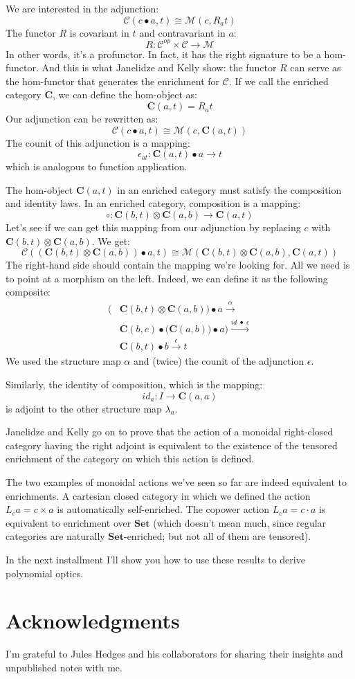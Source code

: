 \documentclass[11pt]{amsart}
\begin{document}
We are interested in the adjunction:
\[ \mathcal{C}( c \bullet a, t) \cong \mathcal{M}(c, R_a t) \]
The functor $R$ is covariant in $t$ and contravariant in $a$:
\[ R \colon \mathcal{C}^{op} \times \mathcal{C} \to \mathcal{M} \]
In other words, it's a profunctor. In fact, it has the right signature to be a hom-functor. And this is what Janelidze and Kelly show: the functor $R$ can serve as the hom-functor that generates the enrichment for $\mathcal{C}$. If we call the enriched category $\mathbf{C}$, we can define the hom-object as:
\[\mathbf{C}(a, t) = R_a t \]
Our adjunction can be rewritten as:
\[ \mathcal{C}( c \bullet a, t) \cong \mathcal{M}(c, \mathbf{C}(a, t)) \]
The counit of this adjunction is a mapping:
\[ \epsilon_{a t} \colon \mathbf{C}(a, t)  \bullet a \to t \]
which is analogous to function application.

The hom-object $\mathbf{C}(a, t)$ in an enriched category must satisfy the composition and identity laws. In an enriched category, composition is a mapping:
\[ \circ \colon \mathbf{C}(b, t) \otimes \mathbf{C}(a, b) \to \mathbf{C}(a, t) \]
Let's see if we can get this mapping from our adjunction by replacing $c$ with $\mathbf{C}(b, t) \otimes \mathbf{C}(a, b)$. We get:
\[ \mathcal{C}( (\mathbf{C}(b, t) \otimes \mathbf{C}(a, b)) \bullet a, t) \cong \mathcal{M}(\mathbf{C}(b, t) \otimes \mathbf{C}(a, b), \mathbf{C}(a, t)) \]
The right-hand side should contain the mapping we're looking for. All we need is to point at a morphism on the left. Indeed, we can define it as the following composite:
\begin{align*}
\big( & \mathbf{C}(b, t) \otimes \mathbf{C}(a, b)\big) \bullet a  \xrightarrow{\alpha}
\\ &\mathbf{C}(b, c) \bullet \big(\mathbf{C}(a, b)) \bullet a\big)   \xrightarrow{id \; \bullet \; \epsilon}
\\ &\mathbf{C}(b, t) \bullet b  \xrightarrow{\epsilon} t
\end{align*}
We used the structure map $\alpha$ and (twice) the counit of the adjunction $\epsilon$.

Similarly, the identity of composition, which is the mapping:
\[ id_a \colon I \to \mathbf{C}(a, a) \]
is adjoint to the other structure map $\lambda_a$.

Janelidze and Kelly go on to prove that the action of a monoidal right-closed category having the right adjoint is equivalent to the existence of the tensored enrichment of the category on which this action is defined.

The two examples of monoidal actions we've seen so far are indeed equivalent to enrichments. A cartesian closed category in which we defined the action $L_c a = c \times a$ is automatically self-enriched. The copower action $L_c a = c \cdot a$ is equivalent to enrichment over $\mathbf{Set}$ (which doesn't mean much, since regular categories are naturally $\mathbf{Set}$-enriched; but not all of them are tensored).

In the next installment I'll show you how to use these results to derive polynomial optics.

\section{Acknowledgments}
I'm grateful to Jules Hedges and his collaborators for sharing their insights and unpublished notes with me.
\end{document}

